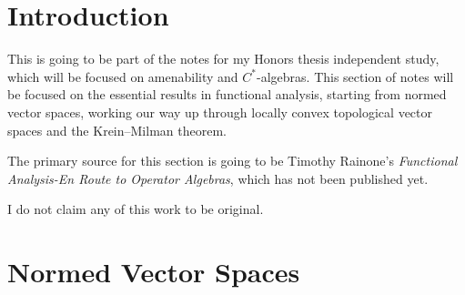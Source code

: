\documentclass[10pt]{mypackage}
\begin{document}
\RaggedRight
\tableofcontents
\section{Introduction}%
This is going to be part of the notes for my Honors thesis independent study, which will be focused on amenability and $C^{\ast}$-algebras. This section of notes will be focused on the essential results in functional analysis, starting from normed vector spaces, working our way up through locally convex topological vector spaces and the Krein--Milman theorem.\newline

The primary source for this section is going to be Timothy Rainone's \textit{Functional Analysis-En Route to Operator Algebras}, which has not been published yet.\newline

I do not claim any of this work to be original.
\section{Normed Vector Spaces}%
\end{document}
